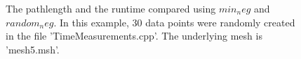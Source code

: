 \documentclass[10pt]{article}
\begin{document}
\begin{figure}[h] 
	\caption{The pathlength and the runtime compared using $ min_neg $ and $ random_neg $. In this example, $ 30 $ data points were randomly created in the file 'TimeMeasurements.cpp'.  The underlying mesh is 'mesh5.msh'.}
	\label{30}
\end{figure}
\end{document}
